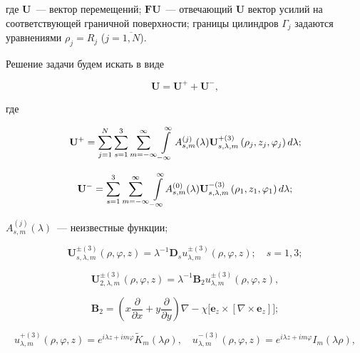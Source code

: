 \noindent где $\mathbf{U}$~--- вектор перемещений; $\mathbf{FU}$~--- отвечающий $\mathbf{U}$ вектор усилий на соответствующей граничной поверхности; границы цилиндров $\Gamma_j$ задаются уравнениями $\rho_j=R_j$ ($j=\overline{1,N}$).

Решение задачи будем искать в виде

\begin{equation}
\mathbf{U}=\mathbf{U}^++\mathbf{U}^-,
\end{equation}

\noindent где

\begin{equation}
{\bf{U}}^+ = \sum\limits_{j = 1}^N {\sum\limits_{s = 1}^3 {\sum\limits_{m =  - \infty }^\infty  {\int\limits_{ - \infty }^\infty  {A_{s,m}^{(j)}} } } } (\lambda ){\bf{U}}_{s,\lambda ,m}^{ + (3)}\left( {{\rho _j},{z_j},{\varphi _j}} \right)d\lambda;
\end{equation}

\begin{equation}
{{\bf{U}}}^- = \sum\limits_{s = 1}^3 {\sum\limits_{m =  - \infty }^\infty  {\mathop \int \limits_{ - \infty }^\infty  } } A_{s,m}^{(0)}(\lambda ){\bf{U}}_{s,\lambda ,m}^{ - (3)}\left( {{\rho _1},{z_1},{\varphi _1}} \right)d\lambda;
\end{equation}

\noindent $A_{s,m}^{(j)}(\lambda )$~--- неизвестные функции;

\begin{equation}
\mathbf{U}_{s,\lambda,m}^{\pm(3)}(\rho,\varphi,z)=\lambda^{-1}\mathbf{D}_s u_{\lambda,m}^{\pm(3)}(\rho,\varphi,z);\quad s=1,3;
\label{eq:7:1}
\end{equation}

\begin{equation}
\mathbf{U}_{2,\lambda,m}^{\pm(3)}(\rho,\varphi,z)=\lambda^{-1}\mathbf{B}_2 u_{\lambda,m}^{\pm(3)}(\rho,\varphi,z),
\label{eq:7:2}
\end{equation}

\begin{equation}
\mathbf{B}_2=\left(x\frac{\partial}{\partial x}+y\frac{\partial}{\partial y}\right)\nabla-\chi\Big[\mathbf{e}_z\times[\nabla\times\mathbf{e}_z]\Big];
\end{equation}

\begin{equation*}
u_{\lambda,m}^{+(3)}(\rho,\varphi,z)=e^{i\lambda z+im\varphi}\tilde K_m(\lambda\rho),\quad
u_{\lambda,m}^{-(3)}(\rho,\varphi,z)=e^{i\lambda z+im\varphi}I_m(\lambda\rho),
\end{equation*}

